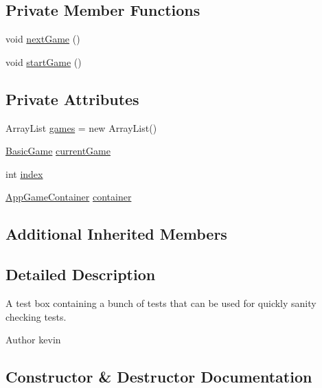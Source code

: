\subsection*{Private Member Functions}
\begin{DoxyCompactItemize}
\item 
void \mbox{\hyperlink{classorg_1_1newdawn_1_1slick_1_1tests_1_1_test_box_ad4155fd01658dadab9faef499d5db7d3}{next\+Game}} ()
\item 
void \mbox{\hyperlink{classorg_1_1newdawn_1_1slick_1_1tests_1_1_test_box_a2b2e8ec08ce37e5a97418578590279e0}{start\+Game}} ()
\end{DoxyCompactItemize}
\subsection*{Private Attributes}
\begin{DoxyCompactItemize}
\item 
Array\+List \mbox{\hyperlink{classorg_1_1newdawn_1_1slick_1_1tests_1_1_test_box_abd3484ab8c25058d32bff289a1b032e6}{games}} = new Array\+List()
\item 
\mbox{\hyperlink{classorg_1_1newdawn_1_1slick_1_1_basic_game}{Basic\+Game}} \mbox{\hyperlink{classorg_1_1newdawn_1_1slick_1_1tests_1_1_test_box_a5e0fdb2f97173d828af597044c525078}{current\+Game}}
\item 
int \mbox{\hyperlink{classorg_1_1newdawn_1_1slick_1_1tests_1_1_test_box_a3421af906cc14a5746f0642cf7c1124a}{index}}
\item 
\mbox{\hyperlink{classorg_1_1newdawn_1_1slick_1_1_app_game_container}{App\+Game\+Container}} \mbox{\hyperlink{classorg_1_1newdawn_1_1slick_1_1tests_1_1_test_box_a686d64440b8b2323907a6c4641669c60}{container}}
\end{DoxyCompactItemize}
\subsection*{Additional Inherited Members}


\subsection{Detailed Description}
A test box containing a bunch of tests that can be used for quickly sanity checking tests.

\begin{DoxyAuthor}{Author}
kevin 
\end{DoxyAuthor}


\subsection{Constructor \& Destructor Documentation}
\mbox{\label{classorg_1_1newdawn_1_1slick_1_1tests_1_1_test_box_a640adeac1eced619cbe249beb5d57058}} 
